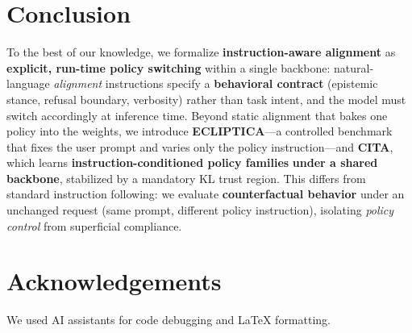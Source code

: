 \documentclass[11pt]{article}
\begin{document}







\section{Conclusion}
\label{sec:conclusion}

To the best of our knowledge, we formalize \textbf{instruction-aware alignment} as \textbf{explicit, run-time policy switching} within a single backbone: natural-language \emph{alignment} instructions specify a \textbf{behavioral contract} (epistemic stance, refusal boundary, verbosity) rather than task intent, and the model must switch accordingly at inference time. Beyond static alignment that bakes one policy into the weights, we introduce \textbf{ECLIPTICA}—a controlled benchmark that fixes the user prompt and varies only the policy instruction—and \textbf{CITA}, which learns \textbf{instruction-conditioned policy families} \textbf{under a shared backbone}, stabilized by a mandatory KL trust region. This differs from standard instruction following: we evaluate \textbf{counterfactual behavior} under an unchanged request (same prompt, different policy instruction), isolating \emph{policy control} from superficial compliance.












\section*{Acknowledgements}
We used AI assistants for code debugging and \LaTeX{} formatting.

\clearpage
\newpage

\end{document}
